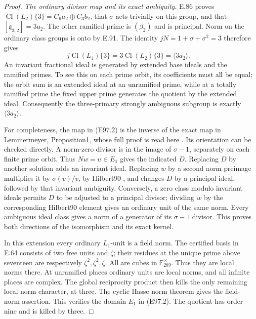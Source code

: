 \begin{proof}
\emph{The ordinary divisor map and its exact ambiguity.}
E.86 proves
\(\operatorname{Cl}(L_2)\{3\}=C_9a_2\oplus C_3b_2\),
that \(\sigma\) acts trivially on this group, and that
\([\mathfrak q_{3,2}]=3a_2\).
The other ramified prime is \((\beta_2)\) and is principal.
Norm on the ordinary class groups is onto by E.91.
The identity \(jN=1+\sigma+\sigma^2=3\) therefore gives
\[
 j\operatorname{Cl}(L_1)\{3\}=3\operatorname{Cl}(L_2)\{3\}
              =\langle3a_2\rangle .
 \tag{E97.5}
\]
An invariant fractional ideal is generated by extended base
ideals and the ramified primes. To see this on each prime
orbit, its coefficients must all be equal; the orbit sum
is an extended ideal at an unramified prime, while at a
totally ramified prime the fixed upper prime generates
the quotient by the extended ideal. Consequently the
three-primary strongly ambiguous subgroup is exactly
\(\langle3a_2\rangle\).

For completeness, the map in (E97.2) is the inverse of
the exact map in Lemmermeyer, Proposition1, whose full
proof is read here \cite[Proposition1]{E_LemmermeyerAmbiguous}.
Its orientation can be checked directly. A norm-zero
divisor is in the image of \(\sigma-1\), separately on
each finite prime orbit. Thus \(Nw=u\in E_1\) gives
the indicated \(D\). Replacing \(D\) by another solution
adds an invariant ideal. Replacing \(w\) by a second
norm preimage multiplies it by \(\sigma(v)/v\), by
Hilbert90 \cite[II, Proposition1.22 and Corollary1.23]{E_MilneCFT},
and changes \(D\) by a principal ideal, followed by
that invariant ambiguity. Conversely, a zero class modulo
invariant ideals permits \(D\) to be adjusted to a
principal divisor; dividing \(w\) by the corresponding
Hilbert90 element gives an ordinary unit of the same norm.
Every ambiguous ideal class gives a norm of a generator
of its \(\sigma-1\) divisor. This proves both directions
of the isomorphism and its exact kernel.

In this extension every ordinary \(L_1\)-unit is a field
norm. The certified basis in E.64 consists of two free
units and \(\zeta\); their residues at the unique prime
above seventeen are respectively \(\zeta^2,\zeta^2,\zeta\).
All are cubes in \(\mathbb F_{289}^{\times}\).
Thus they are local norms there. At unramified places
ordinary units are local norms, and all infinite places
are complex. The global reciprocity product then kills
the only remaining local norm character, at three.
The cyclic Hasse norm theorem
\cite[VIII, Theorem3.1]{E_MilneCFT} gives the field-norm
assertion. This verifies the domain \(E_1\) in (E97.2).
The quotient has order nine and is killed by three.


\end{proof}
